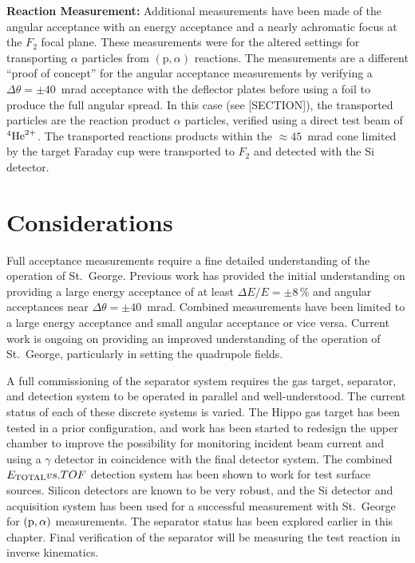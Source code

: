 
\textbf{Reaction Measurement:}
Additional measurements have been made of the angular acceptance with an
energy acceptance and a nearly achromatic focus at the $F_2$ focal
plane. These measurements were for the altered settings for transporting
$\alpha$ particles from $(\textrm{p},\alpha)$ reactions. The
measurements are a different ``proof of concept'' for the angular
acceptance measurements by verifying a $\Delta\theta = \pm 40$~mrad
acceptance with the deflector plates before using a foil to produce the
full angular spread. In this case (see [SECTION]), the transported
particles are the reaction product $\alpha$ particles, verified using a
direct test beam of ${}^{4}\textrm{He}^{2+}$. The transported reactions
products within the $\approx 45$~mrad cone limited by the target Faraday
cup were transported to $F_2$ and detected with the Si detector.


\section{Considerations}

Full acceptance measurements require a fine detailed understanding of
the operation of St.\ George. Previous work has provided the initial
understanding on providing a large energy acceptance of at least $\Delta
E/E = \pm 8$\,\% and angular acceptances near $\Delta\theta = \pm
40$~mrad. Combined measurements have been limited to a large energy
acceptance and small angular acceptance or vice versa. Current work is
ongoing on providing an improved understanding of the operation of St.\
George, particularly in setting the quadrupole fields.

A full commissioning of the separator system requires the gas target,
separator, and detection system to be operated in parallel and
well-understood. The current status of each of these discrete systems is
varied. The Hippo gas target has been tested in a prior configuration,
and work has been started to redesign the upper chamber to improve the
possibility for monitoring incident beam current and using a $\gamma$
detector in coincidence with the final detector system. The combined
$E_{\rm{TOTAL}} vs. TOF$ detection system has been shown to work for
test surface sources. Silicon detectors are known to be very robust, and
the Si detector and acquisition system has been used for a successful
measurement with St.\ George for $(\rm{p},\alpha)$ measurements. The
separator status has been explored earlier in this chapter. Final
verification of the separator will be measuring the test reaction
\react{\mnuc{14}{N}}{\alpha}{\gamma}{\mnuc{18}{F}} in inverse
kinematics.

